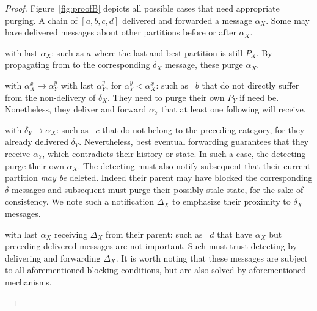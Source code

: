 \begin{proof}
  Figure~\ref{fig:proofB} depicts all possible cases that need
  appropriate purging. A chain of \processes $[a, b, c, d]$ delivered
  and forwarded a message $\alpha_X$. Some \processes may have
  delivered messages about other partitions before or after
  $\alpha_X$.
  \begin{asparadesc}
  \item [\processes with last $\alpha_X$:] \Processes such as $a$
    where the last and best partition is still $P_X$. By propagating
    from \process to \process the corresponding $\delta_X$ message,
    these \processes purge $\alpha_X$.
  \item [\processes with $\alpha_X^x \rightarrow \alpha_Y^y$ with last
    $\alpha_Y^y$, for $\alpha_Y^y< \alpha_X^x$:] \Processes such as
    \Process~$b$ that do not directly suffer from the non-delivery of
    $\delta_X$. They need to purge their own $P_Y$ if need
    be. Nonetheless, they deliver and forward $\alpha_Y$ that at least
    one following \process will receive.
  \item [\processes with $\delta_Y \rightarrow \alpha_X$:] \Processes
    such as \Process~$c$ that do not belong to the preceding category,
    for they already delivered $\delta_Y$. Nevertheless, best eventual
    forwarding guarantees that they receive $\alpha_Y$, which
    contradicts their history or state. In such a case, the detecting
    \processes purge their own $\alpha_X$. The detecting \processes
    must also notify subsequent \processes that their current
    partition \emph{may be} deleted. Indeed their parent may have
    blocked the corresponding $\delta$ messages and subsequent
    \processes must purge their possibly stale state, for the sake of
    consistency.  We note such a notification $\Delta_X$ to emphasize
    their proximity to $\delta_X$ messages.
  \item [\processes with last $\alpha_X$ receiving $\Delta_X$ from
    their parent:] \Processes such as \Process~$d$ that have
    $\alpha_X$ but preceding delivered messages are not
    important. Such \processes must trust detecting \processes by
    delivering and forwarding $\Delta_X$. It is worth noting that
    these messages are subject to all aforementioned blocking
    conditions, but are also solved by aforementioned mechanisms.
  \end{asparadesc}


\end{proof}
